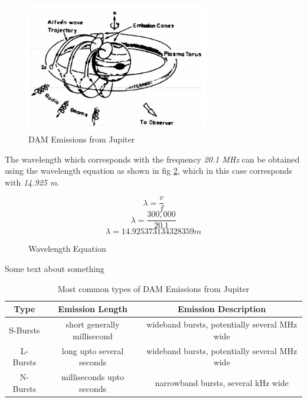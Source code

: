 \documentclass[runningheads,a4paper]{llncs}
\begin{document}
%
\begin{figure}[here]
\centering
\includegraphics[width=8cm]{images/04}
\caption{DAM Emissions from Jupiter \citep{bose08}}
\label{fig:io_flux_tube}
\end{figure}
%
The wavelength which corresponds with the frequency \textit{20.1 MHz} can be obtained using the wavelength equation as shown in fig \ref{fig:wavelength_equation}, which in this case corresponds with \textit{14.925 m}.
%
\begin{figure}[here]
  \centering
  \begin{equation}  	
    \lambda = \frac{v}{f}
  \end{equation}
  \begin{equation}
    \lambda = \frac{300,000}{20.1}
  \end{equation}
  \begin{equation}
    \lambda = 14.925373134328359 m
  \end{equation}
  \caption{Wavelength Equation}
  \label{fig:wavelength_equation}
\end{figure}
%
Some text about something
%
\begin{table}
  \centering
  \begin{tabular}[pos]{| c | c | c |}
    \hline
    Type & Emission Length & Emission Description\\ \hline
    S-Bursts & short generally millisecond & wideband bursts, potentially several MHz wide\\ \hline
    L-Bursts & long upto several seconds & wideband bursts, potentially several MHz wide\\ \hline
    N-Bursts & milliseconds upto seconds & narrowband bursts, several kHz wide\\
    \hline
  \end{tabular}
  \caption{Most common types of DAM Emissions from Jupiter \citep{wilkinson94}}
  \label{tab:dam_emissions}
\end{table}
%
\end{document}
